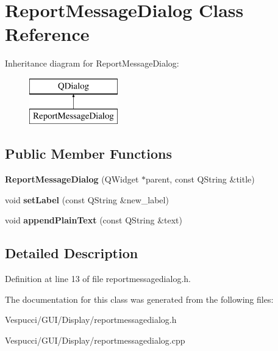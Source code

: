 \hypertarget{class_report_message_dialog}{}\section{Report\+Message\+Dialog Class Reference}
\label{class_report_message_dialog}
Inheritance diagram for Report\+Message\+Dialog\+:\begin{figure}[H]
\begin{center}
\leavevmode
\includegraphics[height=2.000000cm]{class_report_message_dialog}
\end{center}
\end{figure}
\subsection*{Public Member Functions}
\begin{DoxyCompactItemize}
\item 
{\bfseries Report\+Message\+Dialog} (Q\+Widget $\ast$parent, const Q\+String \&title)\hypertarget{class_report_message_dialog_ad62f6e513b9103fdc174be5acceffe65}{}\label{class_report_message_dialog_ad62f6e513b9103fdc174be5acceffe65}

\item 
void {\bfseries set\+Label} (const Q\+String \&new\+\_\+label)\hypertarget{class_report_message_dialog_ae097d7566a5310fae7fd17e175e79d3a}{}\label{class_report_message_dialog_ae097d7566a5310fae7fd17e175e79d3a}

\item 
void {\bfseries append\+Plain\+Text} (const Q\+String \&text)\hypertarget{class_report_message_dialog_a6dc899767475693ae88dab454845c693}{}\label{class_report_message_dialog_a6dc899767475693ae88dab454845c693}

\end{DoxyCompactItemize}


\subsection{Detailed Description}


Definition at line 13 of file reportmessagedialog.\+h.



The documentation for this class was generated from the following files\+:\begin{DoxyCompactItemize}
\item 
Vespucci/\+G\+U\+I/\+Display/reportmessagedialog.\+h\item 
Vespucci/\+G\+U\+I/\+Display/reportmessagedialog.\+cpp\end{DoxyCompactItemize}
